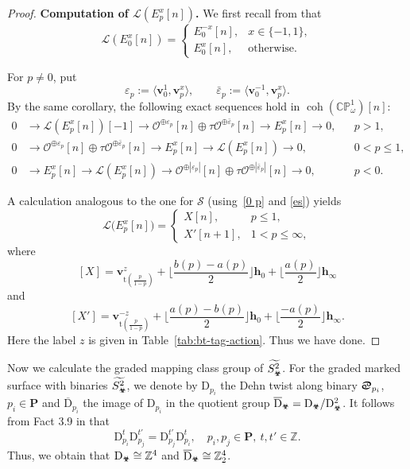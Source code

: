 \documentclass[11pt,a4paper,reqno]{amsart}%
\theoremstyle{plain}
\theoremstyle{definition}
\numberwithin{equation}{section}
\numberwithin{equation}{section}
\def\ZZ{\mathbb{Z}}
\def\wt{\omega}
\newcommand{\bv}{\mathbf{v}}
\def\x{_\vot}
\def\coh{\operatorname{coh}}
\newcommand{\tubR}{\mathcal{S}}
\newcommand{\tubL}{\mathcal{L}}
\def\Dfang{\mathrm{D}^2_\vot}
\newcommand{\typ}[1]{\mathrm{t}(#1)}%
\def\coh{\operatorname{coh}}
\def\CPone{\mathbb{CP}^1_{\wt}}
\renewcommand\P{\mathbf{P}} %
\def\vot{\text{\Biohazard}}
\def\sx{\text{\Cancer}}
\begin{document}
\begin{proof}
\medskip\noindent
\textbf{Computation of $\tubL(E_p^x[n])$.}
We first recall from \cite[Corollary~2.6]{M1997} that
\[
\tubL(E_0^x[n])=
\begin{cases}
E_0^{-x}[n], & x\in\{-1,1\},\\[4pt]
E_0^x[n],    & \text{otherwise}.
\end{cases}
\]

For $p\neq0$, put
\[
\varepsilon_p:=\langle\bv_0^1,\bv_p^x\rangle,\qquad
\bar{\varepsilon}_p:=\langle\bv_0^{-1},\bv_p^x\rangle.
\] 
By the same corollary,  the following exact sequences hold   in $\coh(\CPone)[n]$:
\begin{align*}
0 &\to \tubL(E_p^x[n])[-1]
   \to \mathcal{O}^{\oplus\varepsilon_p}[n] \oplus \tau\mathcal{O}^{\oplus\bar{\varepsilon}_p}[n]
   \to E_p^x[n] \to 0, && p>1,\\[4pt]
0 &\to \mathcal{O}^{\oplus\varepsilon_p}[n] \oplus \tau\mathcal{O}^{\oplus\bar{\varepsilon}_p}[n]
   \to E_p^x[n] \to \tubL(E_p^x[n]) \to 0, && 0<p\le 1,\\[4pt]
0 &\to E_p^x[n] \to \tubL(E_p^x[n])
   \to \mathcal{O}^{\oplus|\varepsilon_p|}[n] \oplus \tau\mathcal{O}^{\oplus|\bar{\varepsilon}_p|}[n]
   \to 0, && p<0.
\end{align*}

A calculation analogous to the one for $\tubR$ (using~\eqref{0 p} and \eqref{es}) yields 
\[
\tubL\bigl(E_{p}^x[n]\bigr)=
\begin{cases}
X[n],   & p\le 1,\\[4pt]
X'[n+1], & 1<p\le\infty,
\end{cases}
\]
where
\[
[X]= \bv_{\typ{\frac{ {p}}{1- {p}}}}^{z}  
+ \lfloor\frac{b(p)-a(p)}{2} \rfloor\mathbf{h}_0
+ \lfloor\frac{a(p)}{2} \rfloor\mathbf{h}_{\infty}
\]
and 
\[
[X']=  \bv_{\typ{\frac{ {p}}{1- {p}}}}^{-z}
+ \lfloor\frac{a(p)-b(p)}{2} \rfloor\mathbf{h}_0
+ \lfloor\frac{-a(p)}{2} \rfloor\mathbf{h}_{\infty}.
\]
Here the label  $z$  is given in Table~\ref{tab:bt-tag-action}. Thus we have done.
\end{proof}
 

 
 Now we calculate 
  the graded mapping class group of  $\widetilde{S\x^2} $.
  For the graded marked surface with binaries $\widetilde{S\x^2} $, we denote by  
  $\mathrm{D}_{p_i}$   the Dehn twist along binary    $\sx_{p_i}$, $p_i\in\P$ and
 $\overline{\mathrm{D}}_{p_i}$   the image of  $\mathrm{D}_{p_i}$ in the quotient group $\overline{\mathrm{D}}_{\vot}=\mathrm{D}_{\vot}/ \Dfang $. It follows from Fact 3.9  in \cite{FM}  that   \[
 \mathrm{D}_{p_i}^{t}\mathrm{D}_{p_j}^{t'}=\mathrm{D}_{p_j}^{t'}\mathrm{D}_{p_i}^{t},\quad   p_i,p_j\in\P,\  t,t'\in \ZZ.
 \] 
 Thus, we obtain that
 $\mathrm{D}_{\vot}\cong \ZZ^4$ and  $\overline{\mathrm{D}}_{\vot}\cong \ZZ_2^4$.
 
\end{document}
